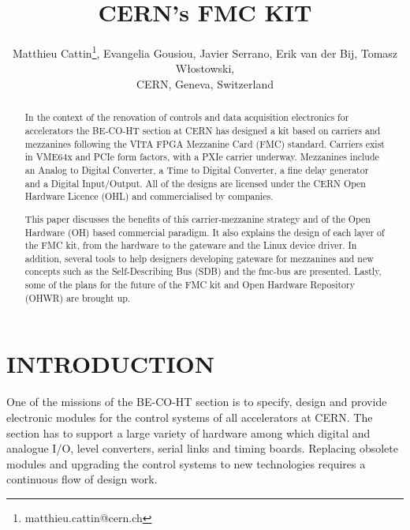\documentclass{JAC2003}
\begin{document}
\title{CERN's FMC KIT}

\author{Matthieu Cattin\thanks{matthieu.cattin@cern.ch}, Evangelia Gousiou, Javier Serrano, Erik van der Bij, Tomasz W\l{}ostowski,\\
CERN, Geneva, Switzerland}

\maketitle

\begin{abstract}
  In the context of the renovation of controls and data acquisition electronics for accelerators the BE-CO-HT section at CERN has designed a kit based on carriers and mezzanines following the VITA FPGA Mezzanine Card (FMC) standard. Carriers exist in VME64x and PCIe form factors, with a PXIe carrier underway. Mezzanines include an Analog to Digital Converter, a Time to Digital Converter, a fine delay generator and a Digital Input/Output. All of the designs are licensed under the CERN Open Hardware Licence (OHL) and commercialised by companies.

This paper discusses the benefits of this carrier-mezzanine strategy and of the Open Hardware (OH) based commercial paradigm.
It also explains the design of each layer of the FMC kit, from the hardware to the gateware and the Linux device driver.
In addition, several tools to help designers developing gateware for mezzanines and new concepts such as the Self-Describing Bus (SDB) and the fmc-bus are presented.
Lastly, some of the plans for the future of the FMC kit and Open Hardware Repository (OHWR) are brought up.
\end{abstract}

\section{INTRODUCTION}
One of the missions of the BE-CO-HT section is to specify, design and provide electronic modules for the control systems of all accelerators at CERN.
The section has to support a large variety of hardware among which digital and analogue I/O, level converters, serial links and timing boards.
Replacing obsolete modules and upgrading the control systems to new technologies requires a continuous flow of design work.
\end{document}
